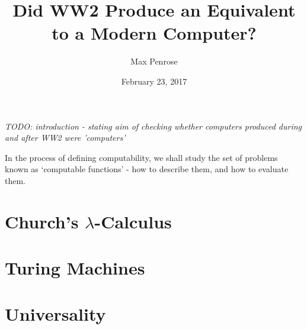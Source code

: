 \documentclass {article}
\title{Did WW2 Produce an Equivalent to a Modern Computer?}
\date{February 23, 2017}
\author{Max Penrose}
\begin{document}
\maketitle
\tableofcontents
\clearpage
\textit{TODO: introduction - stating aim of checking whether computers produced during and after WW2 were 'computers'}

In the process of defining computability, we shall study the set of problems known as `computable functions' - how to describe them, and how to evaluate them. 

\section{Church's $\lambda$-Calculus}



\section{Turing Machines}



\section{Universality}








\end{document}
